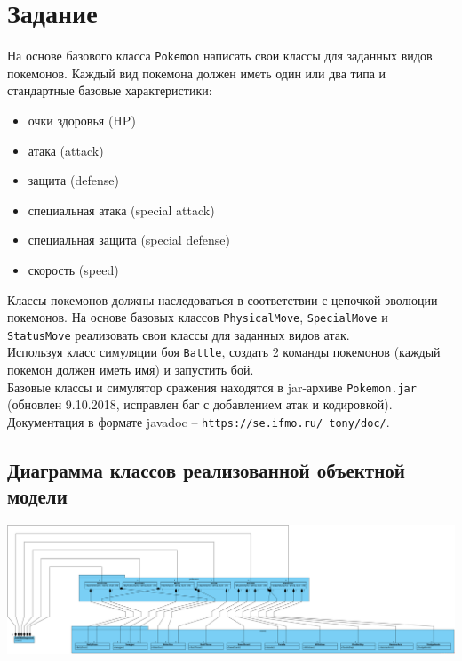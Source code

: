 \documentclass[11pt]{article}
\begin{document}
\section{Задание}
На основе базового класса \texttt{Pokemon} написать свои классы для заданных видов покемонов. Каждый вид покемона должен иметь один или два типа и стандартные базовые характеристики:
\begin{itemize}
	\item очки здоровья (HP)
	\item атака (attack)
	\item защита (defense)
	\item специальная атака (special attack)
	\item специальная защита (special defense)
	\item скорость (speed)
\end{itemize}
Классы покемонов должны наследоваться в соответствии с цепочкой эволюции покемонов. На основе базовых классов \texttt{PhysicalMove}, \texttt{SpecialMove} и \texttt{StatusMove} реализовать свои классы для заданных видов атак.\\
Используя класс симуляции боя \texttt{Battle}, создать 2 команды покемонов (каждый покемон должен иметь имя) и запустить бой.\\
Базовые классы и симулятор сражения находятся в jar-архиве \texttt{Pokemon.jar} (обновлен 9.10.2018, исправлен баг с добавлением атак и кодировкой). 
Документация в формате javadoc -- \texttt{https://se.ifmo.ru/~tony/doc/}.
\pagebreak
\begin{landscape}
\section{Диаграмма классов реализованной объектной модели}
\includegraphics[width=750px]{../Class Diagram1.png}
\end{landscape}
\end{document}
